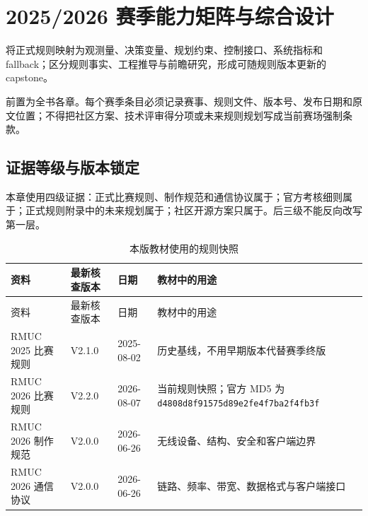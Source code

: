 \chapter{2025/2026 赛季能力矩阵与综合设计}
\label{ch:season}

\begin{learningobjectives}
将正式规则映射为观测量、决策变量、规划约束、控制接口、系统指标和 fallback；区分规则事实、工程推导与前瞻研究，形成可随规则版本更新的 capstone。
\end{learningobjectives}

\begin{prerequisites}
前置为全书各章。每个赛季条目必须记录赛事、规则文件、版本号、发布日期和原文位置；不得把社区方案、技术评审得分项或未来规则规划写成当前赛场强制条款。
\end{prerequisites}

\section{证据等级与版本锁定}

本章使用四级证据：正式比赛规则、制作规范和通信协议属于；官方考核细则属于；正式规则附录中的未来规划属于；社区开源方案只属于。后三级不能反向改写第一层。

\begin{longtable}{p{}p{}p{}p{}}
\caption{本版教材使用的规则快照}\label{tab:season-snapshot}\\
\toprule
资料 & 最新核查版本 & 日期 & 教材中的用途 \\
\midrule
\endfirsthead
\toprule
资料 & 最新核查版本 & 日期 & 教材中的用途 \\
\midrule
\endhead
RMUC 2025 比赛规则 & V2.1.0 & 2025-08-02 & 历史基线，不用早期版本代替赛季终版\cite{rmuc2025_rules} \\
RMUC 2026 比赛规则 & V2.2.0 & 2026-08-07 & 当前规则快照；官方 MD5 为 \nolinkurl{d4808d8f91575d89e2fe4f7ba2f4fb3f}\cite{rmuc2026_rules_v220} \\
RMUC 2026 制作规范 & V2.0.0 & 2026-06-26 & 无线设备、结构、安全和客户端边界\cite{rmuc2026_resource} \\
RMUC 2026 通信协议 & V2.0.0 & 2026-06-26 & 链路、频率、带宽、数据格式与客户端接口\cite{rmuc2026_protocol_v200} \\
\bottomrule
\end{longtable}

